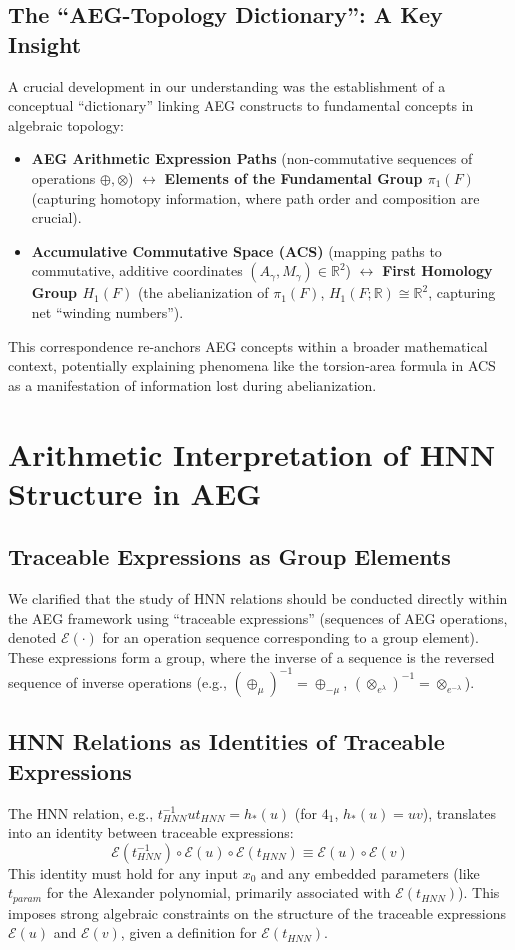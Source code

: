 \documentclass[12pt, a4paper]{article}
\begin{document}
\subsection{The ``AEG-Topology Dictionary'': A Key Insight}
A crucial development in our understanding was the establishment of a conceptual ``dictionary'' linking AEG constructs to fundamental concepts in algebraic topology:
\begin{itemize}
    \item \textbf{AEG Arithmetic Expression Paths} (non-commutative sequences of operations $\oplus, \otimes$) $\longleftrightarrow$ \textbf{Elements of the Fundamental Group $\pi_1(F)$} (capturing homotopy information, where path order and composition are crucial).
    \item \textbf{Accumulative Commutative Space (ACS)} (mapping paths to commutative, additive coordinates $(A_\gamma, M_\gamma) \in \mathbb{R}^2$) $\longleftrightarrow$ \textbf{First Homology Group $H_1(F)$} (the abelianization of $\pi_1(F)$, $H_1(F;\mathbb{R}) \cong \mathbb{R}^2$, capturing net ``winding numbers'').
\end{itemize}
This correspondence re-anchors AEG concepts within a broader mathematical context, potentially explaining phenomena like the torsion-area formula in ACS as a manifestation of information lost during abelianization.

\section{Arithmetic Interpretation of HNN Structure in AEG}
\subsection{Traceable Expressions as Group Elements}
We clarified that the study of HNN relations should be conducted directly within the AEG framework using ``traceable expressions'' (sequences of AEG operations, denoted $\mathcal{E}(\cdot)$ for an operation sequence corresponding to a group element). These expressions form a group, where the inverse of a sequence is the reversed sequence of inverse operations (e.g., $(\oplus_\mu)^{-1} = \oplus_{-\mu}$, $(\otimes_{e^\lambda})^{-1} = \otimes_{e^{-\lambda}}$).

\subsection{HNN Relations as Identities of Traceable Expressions}
The HNN relation, e.g., $t_{HNN}^{-1}ut_{HNN} = h_*(u)$ (for $4_1$, $h_*(u)=uv$), translates into an identity between traceable expressions:
$$ \mathcal{E}(t_{HNN}^{-1}) \circ \mathcal{E}(u) \circ \mathcal{E}(t_{HNN}) \equiv \mathcal{E}(u) \circ \mathcal{E}(v) $$
This identity must hold for any input $x_0$ and any embedded parameters (like $t_{param}$ for the Alexander polynomial, primarily associated with $\mathcal{E}(t_{HNN})$). This imposes strong algebraic constraints on the structure of the traceable expressions $\mathcal{E}(u)$ and $\mathcal{E}(v)$, given a definition for $\mathcal{E}(t_{HNN})$.
\end{document}
